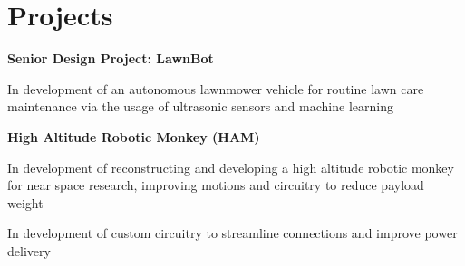 \section{Projects}
    


    \begin{twocolentry}{}
        \textbf{Senior Design Project: LawnBot}
    \end{twocolentry}

    \vspace{0.10 cm}
    \begin{onecolentry}
        \begin{highlights}
            \item In development of an autonomous lawnmower vehicle for routine lawn care maintenance via the usage of ultrasonic sensors and machine learning
        \end{highlights}
    \end{onecolentry}
    
    \vspace{0.2 cm}

    \begin{twocolentry}{
        
    }
        \textbf{High Altitude Robotic Monkey (HAM)}\end{twocolentry}

    \vspace{0.10 cm}
    \begin{onecolentry}
        \begin{highlights}
            \item In development of reconstructing and developing a high altitude robotic monkey for near space research, improving motions and circuitry to reduce payload weight
            \item In development of custom circuitry to streamline connections and improve power delivery
        \end{highlights}
    \end{onecolentry}

